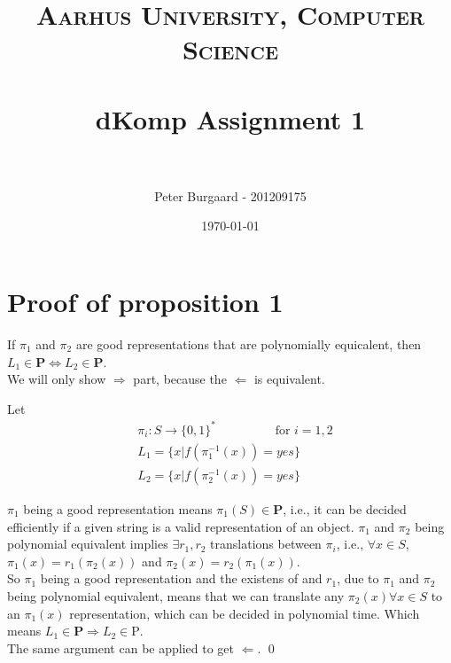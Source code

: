 \documentclass[paper=a4, fontsize=11pt]{scrartcl} %
\title{	
	\normalfont \normalsize 
	\textsc{Aarhus University, Computer Science} \\ [25pt] %
	\horrule{0.5pt} \\[0.4cm] %
	\huge dKomp Assignment 1 \\ %
	\horrule{2pt} \\[0.5cm] %
}
\author{Peter Burgaard - 201209175} %
\date{\normalsize\today} %
\numberwithin{equation}{section} %
\numberwithin{figure}{section} %
\numberwithin{table}{section} %
\begin{document}
	
	\maketitle %
	
	\section{Proof of proposition 1}
	
	If $\pi_1$ and $\pi_2$ are good representations that are polynomially equicalent, then $L_1\in \textbf{P} \iff L_2\in \textbf{P}$. \\
	
	We will only show $\Rightarrow$ part, because the $\Leftarrow$ is equivalent. 
	
	Let  
	\begin{align*}
	&\pi_i:S\rightarrow\{0,1\}^* \hspace{2cm} \text{for } i=1,2  \\
	& L_1=\{x|f(\pi_1^{-1}(x))=yes\} \\
	& L_2=\{x|f(\pi_2^{-1}(x))=yes\}
	\end{align*}
	
	$\pi_1$ being a good representation means $\pi_1(S)\in \textbf{P}$, i.e., it can be decided efficiently if a given string is a valid representation of an object.
	$\pi_1$ and $\pi_2$ being polynomial equivalent implies $\exists r_1, r_2$ translations between $\pi_i$, i.e., $\forall x\in S$, $\pi_1(x)=r_1(\pi_2(x))$ and $\pi_2(x)=r_2(\pi_1(x))$. \\
	
	So $\pi_1$ being a good representation and the existens of and $r_1$, due to $\pi_1$ and $\pi_2$ being polynomial equivalent, means that we can translate any $\pi_2(x)\forall x\in S$ to an $\pi_1(x)$ representation, which can be decided in polynomial time. Which means $L_1\in\textbf{P}\Rightarrow L_2\in\text{P}$. \\
	
	The same argument can be applied to get $\Leftarrow$.
	\qed
\end{document}
